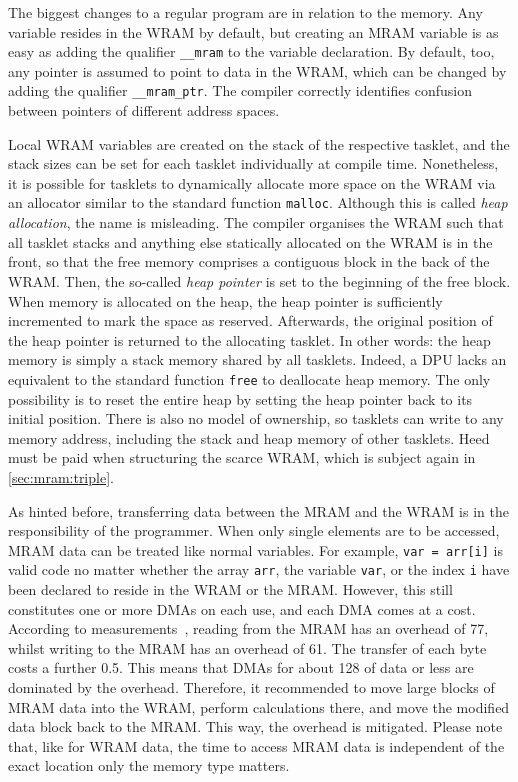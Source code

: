 The biggest changes to a regular \langC{} program are in relation to the memory.
Any variable resides in the \ac{WRAM} by default, but creating an \ac{MRAM} variable is as easy as adding the qualifier \lstinline|__mram| to the variable declaration.
By default, too, any pointer is assumed to point to data in the \ac{WRAM}, which can be changed by adding the qualifier \lstinline|__mram_ptr|.
The compiler correctly identifies confusion between pointers of different address spaces.

Local \ac{WRAM} variables are created on the stack of the respective tasklet, and the stack sizes can be set for each tasklet individually at compile time.
Nonetheless, it is possible for tasklets to dynamically allocate more space on the \ac{WRAM} via an allocator similar to the standard \langC{} function \lstinline|malloc|.
Although this is called \emph{heap allocation}, the name is misleading.
The compiler organises the \ac{WRAM} such that all tasklet stacks and anything else statically allocated on the \ac{WRAM} is in the front, so that the free memory comprises a contiguous block in the back of the \ac{WRAM}.
Then, the so-called \emph{heap pointer} is set to the beginning of the free block.
When memory is allocated on the heap, the heap pointer is sufficiently incremented to mark the space as reserved.
Afterwards, the original position of the heap pointer is returned to the allocating tasklet.
In other words:
the heap memory is simply a stack memory shared by all tasklets.
Indeed, a \ac{DPU} lacks an equivalent to the standard \langC{} function \lstinline|free| to deallocate heap memory.
The only possibility is to reset the entire heap by setting the heap pointer back to its initial position.
There is also no model of ownership, so tasklets can write to any memory address, including the stack and heap memory of other tasklets.
Heed must be paid when structuring the scarce \ac{WRAM}, which is subject again in \cref{sec:mram:triple}.

As hinted before, transferring data between the \ac{MRAM} and the \ac{WRAM} is in the responsibility of the programmer.
When only single elements are to be accessed, \ac{MRAM} data can be treated like normal variables.
For example, \lstinline|var = arr[i]| is valid code no matter whether the array \lstinline|arr|, the variable \lstinline|var|, or the index \lstinline|i| have been declared to reside in the WRAM or the MRAM.
However, this still constitutes one or more \acp{DMA} on each use, and each \ac{DMA} comes at a cost.
According to measurements~\cite{mutlu2022Benchmarking}, reading from the \ac{MRAM} has an overhead of \qty{77}{\cycles}, whilst writing to the \ac{MRAM} has an overhead of \qty{61}{\cycles}.
The transfer of each byte costs a further \qty{0.5}{\cycles}.
This means that \acp{DMA} for about \qty{128}{\byte} of data or less are dominated by the overhead.
Therefore, it recommended to move large blocks of \ac{MRAM} data into the \ac{WRAM}, perform calculations there, and move the modified data block back to the \ac{MRAM}.
This way, the overhead is mitigated.
Please note that, like for \ac{WRAM} data, the time to access \ac{MRAM} data is independent of the exact location \Dash only the memory type matters.

